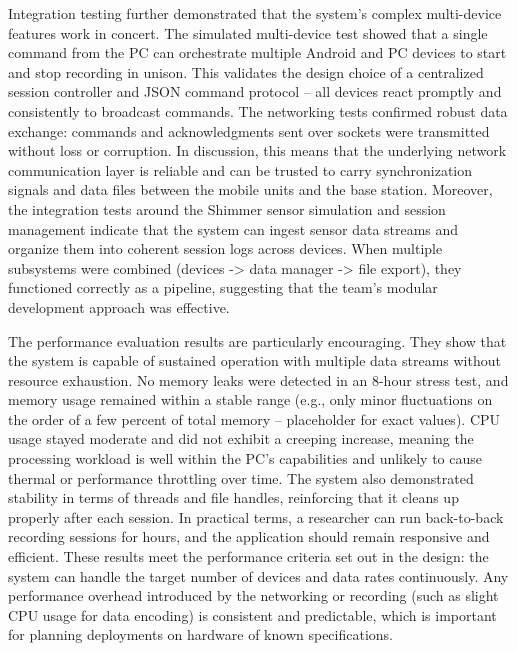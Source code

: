 Integration testing further demonstrated that the system's complex multi-device features work in concert. The simulated multi-device test showed that a single command from the PC can orchestrate multiple Android and PC devices to start and stop recording in unison. This validates the design choice of a centralized session controller and JSON command protocol – all devices react promptly and consistently to broadcast commands. The networking tests confirmed robust data exchange: commands and acknowledgments sent over sockets were transmitted without loss or corruption. In discussion, this means that the underlying network communication layer is reliable and can be trusted to carry synchronization signals and data files between the mobile units and the base station. Moreover, the integration tests around the Shimmer sensor simulation and session management indicate that the system can ingest sensor data streams and organize them into coherent session logs across devices. When multiple subsystems were combined (devices -> data manager -> file export), they functioned correctly as a pipeline, suggesting that the team's modular development approach was effective.

The performance evaluation results are particularly encouraging. They show that the system is capable of sustained operation with multiple data streams without resource exhaustion. No memory leaks were detected in an 8-hour stress test, and memory usage remained within a stable range (e.g., only minor fluctuations on the order of a few percent of total memory – placeholder for exact values). CPU usage stayed moderate and did not exhibit a creeping increase, meaning the processing workload is well within the PC's capabilities and unlikely to cause thermal or performance throttling over time. The system also demonstrated stability in terms of threads and file handles, reinforcing that it cleans up properly after each session. In practical terms, a researcher can run back-to-back recording sessions for hours, and the application should remain responsive and efficient. These results meet the performance criteria set out in the design: the system can handle the target number of devices and data rates continuously. Any performance overhead introduced by the networking or recording (such as slight CPU usage for data encoding) is consistent and predictable, which is important for planning deployments on hardware of known specifications.


